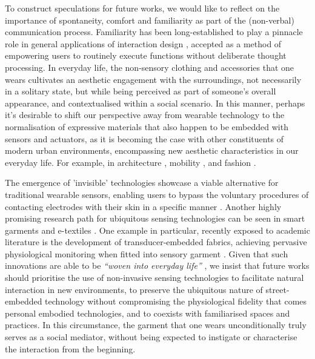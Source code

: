 To construct speculations for future works, we would like to reflect on the importance of spontaneity, comfort and familiarity as part of the (non-verbal) communication process. Familiarity has been long-established to play a pinnacle role in general applications of interaction design \cite{dix_starting_1998}, accepted as a method of empowering users to routinely execute functions without deliberate thought processing. In everyday life, the non-sensory clothing and accessories that one wears cultivates an aesthetic engagement with the surroundings, not necessarily in a solitary state, but while being perceived as part of someone's overall appearance, and contextualised within a social scenario. In this manner, perhaps it's desirable to shift our perspective away from wearable technology to the normalisation of expressive materials that also happen to be embedded with sensors and actuators, as it is becoming the case with other constituents of modern urban environments, encompassing new aesthetic characteristics in our everyday life. For example, in architecture \cite{alvarez_re-imagining_2017}, mobility \cite{nesmachnow_bus_2020}, and fashion \cite{buruk_snowflakes_2021,bang__olufsen_press_collaboration_2022}.

The emergence of 'invisible' technologies showcase a viable alternative for traditional wearable sensors, enabling users to bypass the voluntary procedures of contacting electrodes with their skin in a specific manner \cite{dos_santos_silva_design_2021}. Another highly promising research path for ubiquitous sensing technologies can be seen in smart garments and e-textiles \cite{jarusriboonchai_customisable_2019}. One example in particular, recently exposed to academic literature is the development of transducer-embedded fabrics, achieving pervasive physiological monitoring when fitted into sensory garment \cite{yan_single_2022}. Given that such innovations are able to be \textit{``woven into everyday life''} \cite{song_smart_2022}, we insist that future works should prioritise the use of non-invasive sensing technologies to facilitate natural interaction in new environments, to preserve the ubiquitous nature of street-embedded technology without compromising the physiological fidelity that comes personal embodied technologies, and to coexists with familiarised spaces and practices. In this circumstance, the garment that one wears unconditionally truly serves as a social mediator, without being expected to instigate or characterise the interaction from the beginning.

